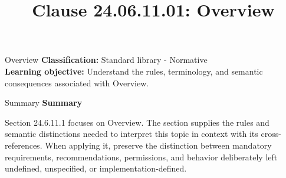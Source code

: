 \documentclass[10pt,letterpaper]{article}
\title{Clause 24.06.11.01: Overview}
\author{}
\date{}
\begin{document}
\maketitle
\begin{CornellOverviewBox}{Overview}
\textbf{Classification:} Standard library - Normative\\[2pt]
\textbf{Learning objective:} Understand the rules, terminology, and semantic consequences associated with Overview.
\end{CornellOverviewBox}\begin{CornellSummaryBox}{Summary}
{\sffamily\bfseries\color{Accent} Summary}\par\vspace{3pt}Section 24.6.11.1 focuses on Overview. The section supplies the rules and semantic distinctions needed to interpret this topic in context with its cross-references. When applying it, preserve the distinction between mandatory requirements, recommendations, permissions, and behavior deliberately left undefined, unspecified, or implementation-defined.
\end{CornellSummaryBox}
\end{document}
